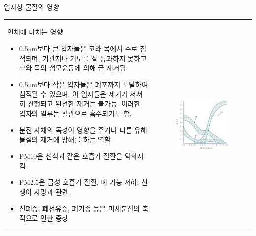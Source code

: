 \begin{frame}[t]{입자상 물질의 영향}
	\begin{tabular}{ll}
		\begin{minipage}[t]{0.5\textwidth}\scriptsize
			인체에 미치는 영향
			\begin{itemize}	
				\item 0.5μm보다 큰 입자들은 코와 목에서 주로 침적되며, 기관지나 기도를 잘 통과하지 못하고 코와 목의 섬모운동에 의해 곧 제거됨.
				\item 0.5μm보다 작은 입자들은 폐포까지 도달하여 침적될 수 있으며, 이 입자들은 제거가 서서히 진행되고 완전한 제거는 불가능. 이러한 입자의 일부는 혈관으로 흡수되기도 함.
				\item 분진 자체의 독성이 영향을 주거나 다른 유해물질의 제거에 방해를 하는 역할
				\item PM10은 천식과 같은 호흡기 질환을 악화시킴
				\item PM2.5은 급성 호흡기 질환, 폐 기능 저하, 신생아 사망과 관련
				\item 진폐증, 폐선유증, 폐기종 등은 미세분진의 축적으로 인한 증상
			\end{itemize}
			
		\end{minipage}	
		&
		\begin{minipage}[t]{0.45\textwidth}
			\begin{figure}[t]
				\includegraphics[width=\linewidth]{images/tsp.png}
			\end{figure}
			
		\end{minipage}
	\end{tabular}
\end{frame}



